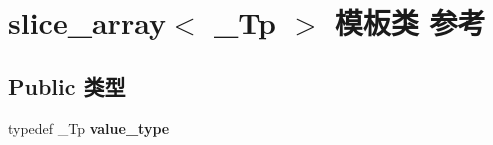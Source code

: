 \hypertarget{classslice__array}{}\section{slice\+\_\+array$<$ \+\_\+\+Tp $>$ 模板类 参考}
\label{classslice__array}
\subsection*{Public 类型}
\begin{DoxyCompactItemize}
\item 
\mbox{\label{classslice__array_a2545e0e72bb7282ddbd7547213cbbe3a}} 
typedef \+\_\+\+Tp {\bfseries value\+\_\+type}
\end{DoxyCompactItemize}
